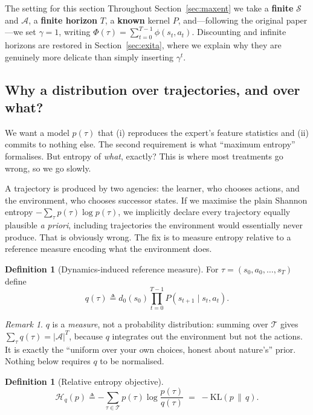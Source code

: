 \documentclass[11pt]{article}
\theoremstyle{plain}
\theoremstyle{definition}
\newtheorem{definition}[theorem]{Definition}
\theoremstyle{remark}
\newtheorem{remark}[theorem]{Remark}
\renewcommand{\S}{\mathcal{S}}
\newcommand{\A}{\mathcal{A}}
\newcommand{\T}{\mathcal{T}}
\newcommand{\KL}{\mathrm{KL}}
\begin{document}
\begin{graybox}{The setting for this section}
Throughout Section~\ref{sec:maxent} we take a \textbf{finite} $\S$ and
$\A$, a \textbf{finite horizon} $T$, a \textbf{known} kernel $P$, and---following
the original paper---we set $\gamma=1$, writing $\Phi(\tau) =
\sum_{t=0}^{T-1}\phi(s_t,a_t)$. Discounting and infinite horizons are
restored in Section~\ref{sec:exita}, where we explain why they are
genuinely more delicate than simply inserting $\gamma^t$.
\end{graybox}

\subsection{Why a distribution over trajectories, and over what?}

We want a model $p(\tau)$ that (i) reproduces the expert's feature
statistics and (ii) commits to nothing else. The second requirement is
what ``maximum entropy'' formalises. But entropy of \emph{what}, exactly?
This is where most treatments go wrong, so we go slowly.

A trajectory is produced by two agencies: the learner, who chooses
actions, and the environment, who chooses successor states. If we maximise
the plain Shannon entropy $-\sum_\tau p(\tau)\log p(\tau)$, we implicitly
declare every trajectory equally plausible \emph{a priori}, including
trajectories the environment would essentially never produce. That is
obviously wrong. The fix is to measure entropy relative to a reference
measure encoding what the environment does.

\begin{definition}[Dynamics-induced reference measure]\label{def:refmeasure}
For $\tau = (s_0,a_0,\ldots,s_T)$ define
\begin{equation}
q(\tau) \triangleq d_0(s_0) \prod_{t=0}^{T-1} P(s_{t+1}\mid s_t,a_t).
\label{eq:refmeasure}
\end{equation}
\end{definition}

\begin{remark}
$q$ is a \emph{measure}, not a probability distribution: summing over
$\T$ gives $\sum_\tau q(\tau) = |\A|^T$, because $q$ integrates out the
environment but not the actions. It is exactly the ``uniform over your own
choices, honest about nature's'' prior. Nothing below requires $q$ to be
normalised.
\end{remark}

\begin{definition}[Relative entropy objective]
\begin{equation}
\mathcal{H}_q(p) \triangleq -\sum_{\tau\in\T} p(\tau)\log\frac{p(\tau)}{q(\tau)}
\;=\; -\KL(p\,\|\,q).
\label{eq:relentropy}
\end{equation}
\end{definition}
\end{document}
